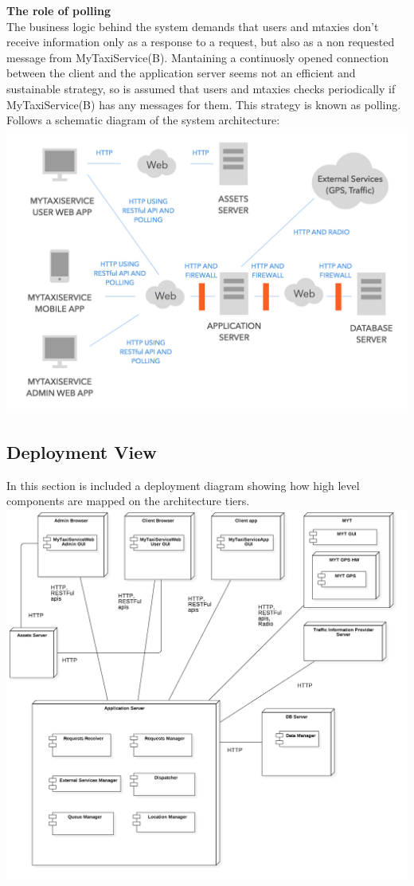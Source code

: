 \documentclass[11pt,titlepage]{article} %
\begin{document}
        \textbf{The role of polling}\hfill \\
        The business logic behind the system demands that users and mtaxies don't  receive information only as a response to a request, but
        also as a non requested message from MyTaxiService(B). Mantaining a continuosly opened connection between the client and the application server
        seems not an efficient and sustainable strategy, so is assumed that users and mtaxies checks periodically if MyTaxiService(B) has any messages
        for them. This strategy is known as polling.\newline
        \newpage
        Follows a schematic diagram of the system architecture:\newline
        \includegraphics[scale=0.3]{Arch.jpg}
 
\newpage

\subsection{Deployment View}
In this section is included a deployment diagram showing how high level components are mapped on the architecture tiers.\newline
\includegraphics[scale=0.4]{deployment.png}
\end{document}
